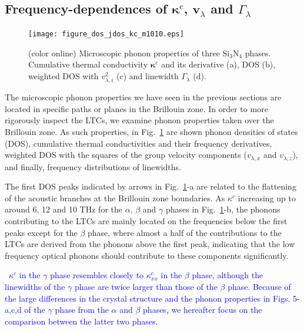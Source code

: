 \documentclass[twocolumn,amsmath,amssymb,a4paper,prb,superscriptaddress,floatfix]{revtex4-1}
\begin{document}
\subsection{Frequency-dependences of $\boldsymbol{\kappa}^\text{c}$, $\mathbf{v}$$_\lambda$ and $\Gamma_\lambda$}

\begin{figure}[ht]
 \begin{center}
  \texttt{[image: figure\_dos\_jdos\_kc\_m1010.eps]}
  \caption{(color online) Microscopic phonon properties of three Si$_3$N$_4$
	  phases. Cumulative thermal conductivity $\mathbf{\kappa}^\text{c}$ and its derivative
	  (a), DOS (b), weighted DOS with $v_{\lambda,i}^2$ (c) and linewidth $\Gamma_\lambda$ (d).
  \label{fig:Fig5_338_rev} }
 \end{center}
\end{figure}

The microscopic phonon properties we have seen in the previous sections are
located in specific paths or planes in the Brillouin zone. In order to more
rigorously inspect the LTCs, we examine  phonon properties taken over the
Brillouin zone. As such properties, in Fig.~\ref{fig:Fig5_338_rev} are shown
phonon densities of states (DOS), cumulative thermal conductivities and their
frequency derivatives, weighted DOS with the squares of the group velocity
components ($v_{\lambda,x}$ and $v_{\lambda,z}$), and finally,
frequency distributions of linewidths. 

The first DOS peaks indicated by arrows in Fig.~\ref{fig:Fig5_338_rev}-a are
related to the flattening of the acoustic branches at the Brillouin zone
boundaries. As $\kappa^c$ increasing up to around 6, 12 and 10 THz for the
$\alpha$, $\beta$ and $\gamma$ phases in Fig.~\ref{fig:Fig5_338_rev}-b, the
phonons contributing to the LTCs are mainly located on the frequencies below
the first peaks except for the $\beta$ phase, where almost a half of the
contributions to the LTCs are derived from the phonons above the first peak,
indicating that the low frequency optical phonons should contribute to these
components significantly.  

~\textcolor{blue}{$\kappa^c$ in the $\gamma$ phase resembles closely to
$\kappa_{xx}^c$ in the $\beta$ phase, although the linewidths of the
$\gamma$ phase are twice larger than those of the $\beta$ phase.
Because of the large differences in the crystal structure and the phonon
properties in Figs. 5-a,c,d of the $\gamma$ phase from the $\alpha$ and $\beta$
phases, we hereafter focus on the comparison between the latter two phases.} 
\end{document}
